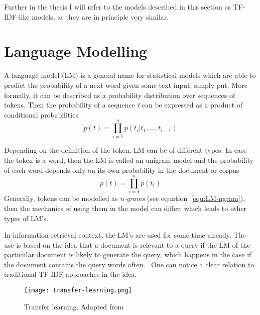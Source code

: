     Further in the thesis I will refer to the models described in this section as TF-IDF-like models, as they are in principle very similar.


\section{Language Modelling}
\label{section:language-modelling}
    A language model (LM) is a general name for statistical models which are able to predict the probability of a next word given some text input, simply put. More formally, it can be described as a probability distribution over sequences of tokens. Then the probability of a sequence \emph{t} can be expressed as a product of conditional probabilities 
    \begin{equation}
        \label{equ:LM-ngram}
        p(t) = \prod_{i=1}^{n}p(t_{i}|{t_1,\dots, t_{i-1}})
    \end{equation}
    
    \noindent Depending on the definition of the token, LM can be of different types. In case the token is a word, then the LM is called an unigram model and the probability of each word depends only on its own probability in the document or corpus
    \begin{equation}
        p(t) = \prod_{i=1}^{n}p(t_{i})  
    \end{equation}
    Generally, tokens can be modelled as \emph{n-grams} (see equation~\ref{equ:LM-ngram}), then the mechanics of using them in the model can differ, which leads to other types of LM's. %
    
    In information retrieval context, the LM's are used for some time already. The use is based on the idea that a document is relevant to a query if the LM of the particular document is likely to generate the query, which happens in the case if the document contains the query words often.~\parencite{manning2008introduction} One can notice a clear relation to traditional TF-IDF approaches in the idea.
    
    \begin{figure}[H]
        \texttt{[image: transfer-learning.png]}
        \centering
        \caption[Transfer learning]{Transfer learning. Adapted from~\parencite{ruder2021lmfine-tuning}}
        \label{fig:transfer-learning}
    \end{figure}
    
